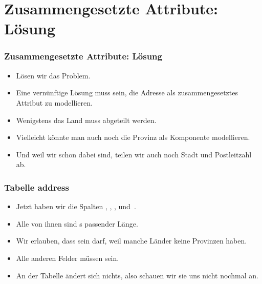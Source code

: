 \documentclass[aspectratio=169,mathserif,notheorems]{beamer}%
\begin{document}
\section{Zusammengesetzte Attribute: Lösung}%
%
\begin{frame}[t]%
\frametitle{Zusammengesetzte Attribute: Lösung}%
\begin{itemize}%
%
\item Lösen wir das Problem.%
%
\item<2-> Eine vernünftige Lösung muss sein, die Adresse als zusammengesetztes Attribut zu modellieren.%
%
\item<3-> Wenigstens das Land muss abgeteilt werden.%
%
\item<4-> Vielleicht könnte man auch noch die Provinz als Komponente modellieren.%
%
\item<5-> Und weil wir schon dabei sind, teilen wir auch noch Stadt und Postleitzahl ab.%
%
\end{itemize}%
%
\end{frame}%
%
%
\begin{frame}[t]%
\frametitle{Tabelle address}%
\parbox{0.435\linewidth}{\small%
\begin{itemize}%
%
%
%
\item<2-> Jetzt haben wir die Spalten , , ,  und~.%
%
\item<3-> Alle von ihnen sind s passender Länge.%
%
\item<4-> Wir erlauben, dass   sein darf, weil manche Länder keine Provinzen haben.%
%
\item<5-> Alle anderen Felder müssen  sein.%
%
\item<6-> An der Tabelle  ändert sich nichts, also schauen wir sie uns nicht nochmal an.%
%
\end{itemize}%
}%
%
%
%
\end{frame}%
\end{document}
